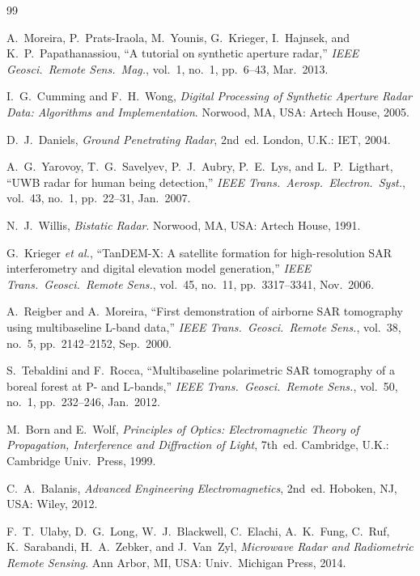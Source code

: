 \documentclass[journal]{IEEEtran}
\begin{document}

\begin{thebibliography}{99}

A.~Moreira, P.~Prats-Iraola, M.~Younis, G.~Krieger, I.~Hajnsek,
and K.~P.~Papathanassiou,
``A tutorial on synthetic aperture radar,''
\emph{IEEE Geosci.\ Remote Sens.\ Mag.}, vol.~1, no.~1, pp.~6--43,
Mar.~2013.

I.~G.~Cumming and F.~H.~Wong,
\emph{Digital Processing of Synthetic Aperture Radar Data: Algorithms and
Implementation}.
Norwood, MA, USA: Artech House, 2005.

D.~J.~Daniels,
\emph{Ground Penetrating Radar}, 2nd~ed.
London, U.K.: IET, 2004.

A.~G.~Yarovoy, T.~G.~Savelyev, P.~J.~Aubry, P.~E.~Lys, and L.~P.~Ligthart,
``UWB radar for human being detection,''
\emph{IEEE Trans.\ Aerosp.\ Electron.\ Syst.}, vol.~43, no.~1,
pp.~22--31, Jan.~2007.

N.~J.~Willis,
\emph{Bistatic Radar}.
Norwood, MA, USA: Artech House, 1991.

G.~Krieger \emph{et al.},
``TanDEM-X: A satellite formation for high-resolution SAR
interferometry and digital elevation model generation,''
\emph{IEEE Trans.\ Geosci.\ Remote Sens.}, vol.~45, no.~11,
pp.~3317--3341, Nov.~2006.

A.~Reigber and A.~Moreira,
``First demonstration of airborne SAR tomography using multibaseline
L-band data,''
\emph{IEEE Trans.\ Geosci.\ Remote Sens.}, vol.~38, no.~5,
pp.~2142--2152, Sep.~2000.

S.~Tebaldini and F.~Rocca,
``Multibaseline polarimetric SAR tomography of a boreal forest at P-
and L-bands,''
\emph{IEEE Trans.\ Geosci.\ Remote Sens.}, vol.~50, no.~1,
pp.~232--246, Jan.~2012.

M.~Born and E.~Wolf,
\emph{Principles of Optics: Electromagnetic Theory of Propagation,
Interference and Diffraction of Light}, 7th~ed.
Cambridge, U.K.: Cambridge Univ.\ Press, 1999.

C.~A.~Balanis,
\emph{Advanced Engineering Electromagnetics}, 2nd~ed.
Hoboken, NJ, USA: Wiley, 2012.

F.~T.~Ulaby, D.~G.~Long, W.~J.~Blackwell, C.~Elachi, A.~K.~Fung,
C.~Ruf, K.~Sarabandi, H.~A.~Zebker, and J.~Van~Zyl,
\emph{Microwave Radar and Radiometric Remote Sensing}.
Ann Arbor, MI, USA: Univ.\ Michigan Press, 2014.


\end{thebibliography}
\end{document}

